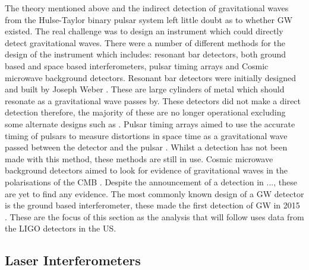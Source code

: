 The theory mentioned above and the indirect detection of gravitational waves from the Hulse-Taylor binary pulsar system left little doubt as to whether \ac{GW} existed. 
The real challenge was to design an instrument which could directly detect gravitational waves.
There were a number of different methods for the design of the instrument which includes: resonant bar detectors, both ground based and space based interferometers, pulsar timing arrays and Cosmic microwave background detectors. 
Resonant bar detectors were initially designed and built by Joseph Weber \citep{}.
These are large cylinders of metal which should resonate as a gravitational wave passes by. 
These detectors did not make a direct detection therefore, the majority of these are no longer operational excluding some alternate designs such as \citep{}.
Pulsar timing arrays aimed to use the accurate timing of pulsars to measure distortions in space time as a gravitational wave passed between the detector and the pulsar \citep{}. 
Whilst a detection has not been made with this method, these methods are still in use.
Cosmic microwave background detectors aimed to look for evidence of gravitational waves in the polarisations of the CMB \citep{}. 
Despite the announcement of a detection in ..., these are yet to find any evidence.
The most commonly known design of a \ac{GW} detector is the ground based interferometer, these made the first detection of \ac{GW} in 2015 \citep{}.
These are the focus of this section as the analysis that will follow uses data from the \ac{LIGO} detectors in the US.

\subsection{Laser Interferometers}

